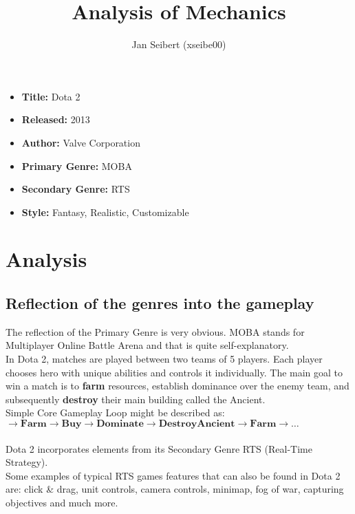 \documentclass[a4paper,10pt,english]{article}
\title{%
Analysis of Mechanics%
}
\author{%
Jan Seibert (xseibe00)%
}
\date{}
\begin{document}
\maketitle
\thispagestyle{empty}

{%
\large

\begin{itemize}

\item[] \textbf{Title:} {Dota 2}

\item[] \textbf{Released:} {2013}

\item[] \textbf{Author:} {Valve Corporation}

\item[] \textbf{Primary Genre:} {MOBA}

\item[] \textbf{Secondary Genre:} {RTS}

\item[] \textbf{Style:} {Fantasy, Realistic, Customizable}

\end{itemize}

}

\section*{\centering Analysis}

\subsection*{Reflection of the genres into the gameplay}

The reflection of the Primary Genre is very obvious. MOBA stands for Multiplayer Online Battle Arena and that is quite self-explanatory. \\
In Dota 2, matches are played between two teams of 5 players. Each player chooses hero with unique abilities and controls it individually. The main goal to win a match is to \textbf{farm} resources, establish dominance over the enemy team, and subsequently \textbf{destroy} their main building called the Ancient. \\
Simple Core Gameplay Loop might be described as: \\
$\mathbf{\rightarrow Farm \rightarrow Buy \rightarrow Dominate \rightarrow Destroy Ancient \rightarrow Farm \rightarrow \ldots}$ \\ \\
Dota 2 incorporates elements from its Secondary Genre RTS (Real-Time Strategy). \\
Some examples of typical RTS games features that can also be found in Dota 2 are: click \& drag, unit controls, camera controls, minimap, fog of war, capturing objectives and much more.
\end{document}
